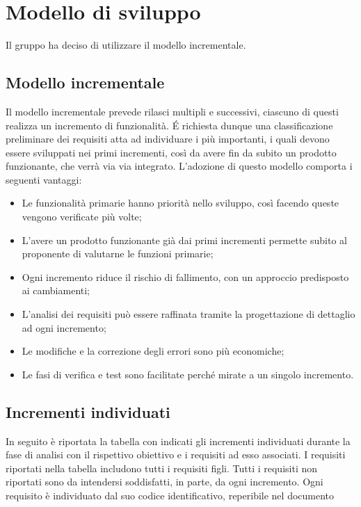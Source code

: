 \section{Modello di sviluppo}
Il gruppo ha deciso di utilizzare il modello incrementale.
\subsection{Modello incrementale}
Il modello incrementale prevede rilasci multipli e successivi, ciascuno di questi realizza un incremento di funzionalità.
É richiesta dunque una classificazione preliminare dei requisiti atta ad individuare i più importanti, i quali devono essere sviluppati nei primi incrementi, così da avere fin da subito un prodotto funzionante, che verrà via via integrato.
L'adozione di questo modello comporta i seguenti vantaggi:
\begin{itemize}
\item Le funzionalità primarie hanno priorità nello sviluppo, così facendo queste vengono verificate più volte;
\item L'avere un prodotto funzionante già dai primi incrementi permette subito al proponente di valutarne le funzioni primarie;
\item Ogni incremento riduce il rischio di fallimento, con un approccio predisposto ai cambiamenti;
\item L'analisi dei requisiti può essere raffinata tramite la progettazione di dettaglio ad ogni incremento;
\item Le modifiche e la correzione degli errori sono più economiche;
\item Le fasi di verifica e test sono facilitate perché mirate a un singolo incremento.
\end{itemize}
\subsection{Incrementi individuati}
In seguito è riportata la tabella con indicati gli incrementi individuati durante la fase di analisi con il rispettivo obiettivo e i requisiti ad esso associati.
I requisiti riportati nella tabella includono tutti i requisiti figli. Tutti i requisiti non riportati sono da intendersi soddisfatti, in parte, da ogni incremento.
Ogni requisito è individuato dal suo codice identificativo, reperibile nel documento \AdRv{}

